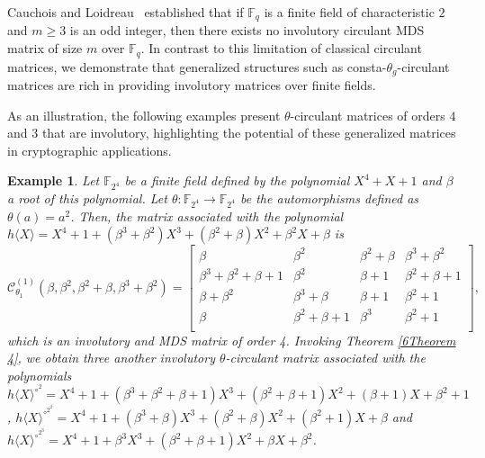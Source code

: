 \documentclass[12pt]{article}
\newtheorem{example}{Example}
\begin{document}
Cauchois and Loidreau~\cite{cauchois2019circulant} established that if $\mathbb{F}_q$ is a finite field of characteristic $2$ and $m \geq 3$ is an odd integer, then there exists no involutory circulant MDS matrix of size $m$ over $\mathbb{F}_q$. In contrast to this limitation of classical circulant matrices, we demonstrate that generalized structures such as consta-$\theta_g$-circulant matrices are rich in providing involutory matrices over finite fields. 

As an illustration, the following examples present $\theta$-circulant matrices of orders $4$ and $3$ that are involutory, highlighting the potential of these generalized matrices in cryptographic applications.

\begin{example}
	Let $\mathbb{F}_{2^4}$ be  a finite field defined by the polynomial $X^4+X+1$ and $\beta$ a root of this polynomial. Let $\theta:\mathbb{F}_{2^4}\longrightarrow \mathbb{F}_{2^4}$ be the automorphisms defined as $\theta(a)=a^2$. Then, the matrix associated with the polynomial $h\langle X \rangle=X^4+1+(\beta^3+\beta^2)X^3+(\beta^2+\beta)X^2+\beta^2X+\beta$  is 
	$$\mathcal{C}_{\theta_1}^{(1)}(\beta, \beta^2, \beta^2+\beta, \beta^3+\beta^2)=\begin{bmatrix}
		\beta&\beta^2&\beta^2+\beta&\beta^3+\beta^2\\
		\beta^3+\beta^2+\beta+1&\beta^2&\beta+1&\beta^2+\beta+1\\
		\beta+\beta^2&\beta^3+\beta&\beta+1&\beta^2+1\\
		\beta&\beta^2+\beta+1&\beta^3&\beta^2+1\\
		
	\end{bmatrix}, $$
	which is an involutory and MDS matrix of order 4. Invoking  Theorem \ref{6Theorem 4}, we obtain three another involutory $\theta$-circulant matrix associated with the polynomials $h\langle X \rangle^{\circ^2}=X^4+1+(\beta^3+\beta^2+\beta+1)X^3+(\beta^2+\beta+1)X^2+(\beta+1)X+\beta^2+1$,  $h\langle X \rangle^{\circ^{2^2}}=X^4+1+(\beta^3+\beta)X^3+(\beta^2+\beta)X^2+(\beta^2+1)X+\beta$ and $h\langle X \rangle^{\circ^{2^3}}=X^4+1+\beta^3X^3+(\beta^2+\beta+1) X^2+\beta X+\beta^2$.
\end{example}
\end{document}
